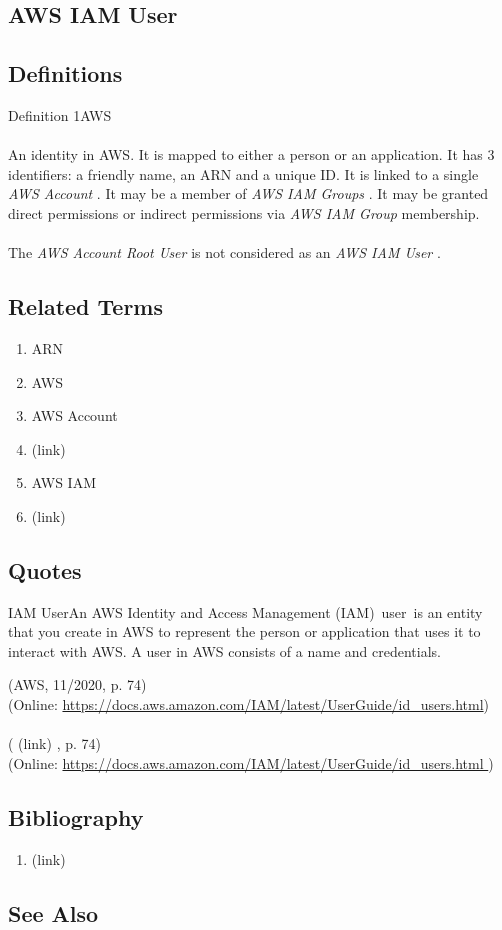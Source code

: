 \newpage \subsection*{AWS IAM User } \subsection*{Definitions } \begin{DIC_Def}{Definition 1AWS }{} \paragraph{} An identity in AWS. It is mapped to either a person or an application. It has 3 identifiers: a friendly name, an ARN and a unique ID. It is linked to a single  \emph{ AWS Account  } . It may be a member of  \emph{ AWS IAM Groups  } . It may be granted direct permissions or indirect permissions via  \emph{ AWS IAM Group  } membership.  \paragraph{} The  \emph{ AWS Account Root User  } is not considered as an  \emph{ AWS IAM User  } .  \end{DIC_Def} \subsection*{Related Terms } \begin{enumerate} \item  ARN  \item  AWS  \item  AWS Account  \item  (link) \href{AWS Account Root User (Dictionary Entry) }{ }   \item  AWS IAM  \item  (link) \href{AWS IAM Group (Dictionary Entry) }{ }   \end{enumerate} \subsection*{Quotes } \begin{DIC_BlockQuote} IAM UserAn AWS Identity and Access Management (IAM)~user~is an entity that you create in AWS to represent the person or application that uses it to interact with AWS. A user in AWS consists of a name and credentials.  \end{DIC_BlockQuote} (AWS, 11/2020, p. 74)\\ (Online: \url{https://docs.aws.amazon.com/IAM/latest/UserGuide/id_users.html})  \paragraph{} (  (link) \href{AWS, 11/2020 }{ } , p. 74)  \\  (Online:  \href{None }{https://docs.aws.amazon.com/IAM/latest/UserGuide/id\_users.html } )  \subsection*{Bibliography } \begin{enumerate} \item  (link) \href{AWS, 11/2020 }{ }   \end{enumerate} \subsection*{See Also } 